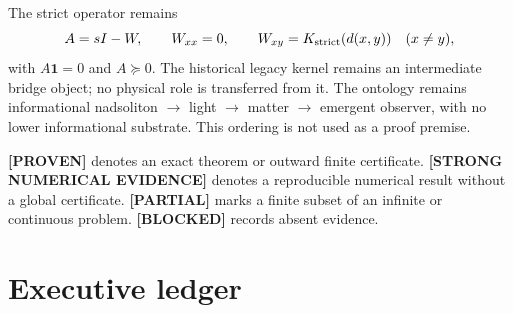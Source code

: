 \documentclass[11pt,a4paper]{article}
\newcommand{\Proven}{\textcolor{proved}{\textbf{[PROVEN]}}}
\newcommand{\Evidence}{\textcolor{conditional}{\textbf{[STRONG NUMERICAL EVIDENCE]}}}
\newcommand{\Partial}{\textcolor{conditional}{\textbf{[PARTIAL]}}}
\newcommand{\Blocked}{\textcolor{blocked}{\textbf{[BLOCKED]}}}
\begin{document}
The strict operator remains
\[
A=sI-W,\qquad W_{xx}=0,\qquad W_{xy}=K_{\rm strict}(d(x,y))\quad(x\ne y),
\]
with $A\mathbf1=0$ and $A\succeq0$. The historical legacy kernel remains an intermediate
bridge object; no physical role is transferred from it. The ontology remains
informational nadsoliton $\to$ light $\to$ matter $\to$ emergent observer, with no lower
informational substrate. This ordering is not used as a proof premise.

\Proven{} denotes an exact theorem or outward finite certificate. \Evidence{} denotes a
reproducible numerical result without a global certificate. \Partial{} marks a finite subset
of an infinite or continuous problem. \Blocked{} records absent evidence.

\section{Executive ledger}
\small
\end{document}

